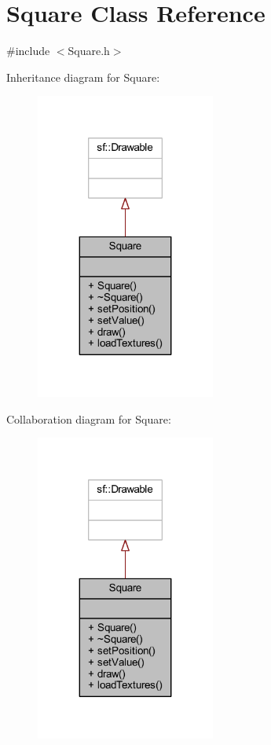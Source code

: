 \hypertarget{class_square}{}\section{Square Class Reference}
\label{class_square}


{\ttfamily \#include $<$Square.\+h$>$}



Inheritance diagram for Square\+:
\nopagebreak
\begin{figure}[H]
\begin{center}
\leavevmode
\includegraphics[width=167pt]{class_square__inherit__graph}
\end{center}
\end{figure}


Collaboration diagram for Square\+:
\nopagebreak
\begin{figure}[H]
\begin{center}
\leavevmode
\includegraphics[width=167pt]{class_square__coll__graph}
\end{center}
\end{figure}
